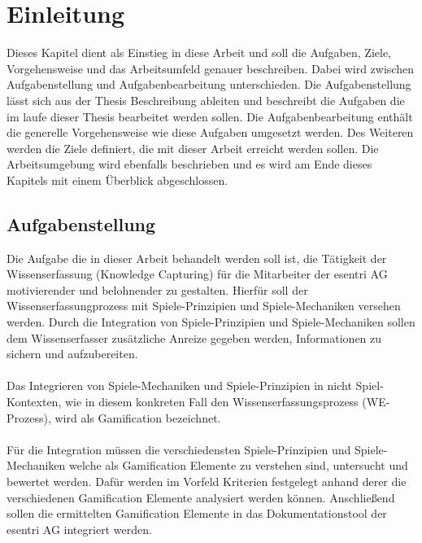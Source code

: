\documentclass[a4paper,12pt]{scrartcl}
\begin{document}
\section{Einleitung}
Dieses Kapitel dient als Einstieg in diese Arbeit und soll die Aufgaben, Ziele, Vorgehensweise und das Arbeitsumfeld genauer beschreiben. Dabei wird zwischen Aufgabenstellung und Aufgabenbearbeitung unterschieden. Die Aufgabenstellung lässt sich aus der Thesis Beschreibung ableiten und beschreibt die Aufgaben die im laufe dieser Thesis bearbeitet werden sollen. Die Aufgabenbearbeitung enthält die generelle Vorgehensweise wie diese Aufgaben umgesetzt werden. Des Weiteren werden die Ziele definiert, die mit dieser Arbeit erreicht werden sollen. Die Arbeitsumgebung wird ebenfalls beschrieben und es wird am Ende dieses Kapitels mit einem Überblick abgeschlossen. 
\subsection{Aufgabenstellung}
Die Aufgabe die in dieser Arbeit behandelt werden soll ist, die Tätigkeit der Wissenserfassung (Knowledge Capturing) für die Mitarbeiter der esentri AG motivierender und belohnender zu gestalten. Hierfür soll der Wissenserfassungprozess mit Spiele-Prinzipien und Spiele-Mechaniken versehen werden. Durch die Integration von Spiele-Prinzipien und Spiele-Mechaniken sollen dem Wissenserfasser zusätzliche Anreize gegeben werden, Informationen zu sichern und aufzubereiten. 
\\\\
Das Integrieren von Spiele-Mechaniken und Spiele-Prinzipien in nicht Spiel-Kontexten, wie in diesem konkreten Fall den Wissenserfassungsprozess (WE-Prozess), wird als Gamification bezeichnet.
\\\\
Für die Integration müssen die verschiedensten Spiele-Prinzipien und Spiele-Mechaniken welche als Gamification Elemente zu verstehen sind, untersucht und bewertet werden. Dafür werden im Vorfeld Kriterien festgelegt anhand derer die verschiedenen Gamification Elemente analysiert werden können. Anschließend sollen die ermittelten Gamification Elemente in das Dokumentationstool der esentri AG integriert werden. 
\end{document}
